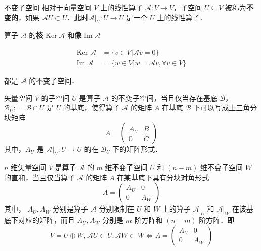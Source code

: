 

\begin{definition}{不变子空间}
相对于向量空间 $V$ 上的线性算子 $\mathcal{A}: V \rightarrow V$，子空间 $U \subseteq V$ 被称为\textbf{不变的}，如果 $\mathcal{A} U \subset U$．此时$\mathcal{A}|_U: U \to U$ 是一个 $U$ 上的线性算子．
\end{definition}

\begin{example}{}
算子 $\mathcal{A}$ 的\textbf{核} $\mathrm{Ker}\;\mathcal A$ 和\textbf{像} $\mathrm{Im}\;\mathcal{A}$

\begin{equation}\label{InvSP_eq3}
\begin{aligned}
\mathrm{Ker}\;\mathcal{A}&=\{ v\in V|\mathcal{A} v= 0\}\\
\mathrm{Im}\;\mathcal{A}&=\{ w\in V| w=\mathcal{A} v,\forall v\in V\}
\end{aligned}
\end{equation}

都是 $\mathcal A$ 的不变子空间．
\end{example}

\begin{theorem}{}
矢量空间 $V$ 的子空间 $U$ 是算子 $\mathcal{A}$ 的不变子空间，当且仅当存在基底 $\mathcal{B}$， $\mathcal{B}_U: = \mathcal{B} \cap U$ 是 $U$ 的基底，使得算子 $\mathcal{A}$ 的矩阵 $A$ 在基底 $\mathcal{B}$ 下可以写成上三角分块矩阵
\begin{equation}
A = \begin{pmatrix}
A_U & B\\
0 & C
\end{pmatrix}
\end{equation}
其中，$A_U$ 是 $\mathcal{A}|_{U}: U \to U$ 的在 $\mathcal{B}_U$ 下的矩阵形式．
\end{theorem}

\begin{theorem}{}\label{InvSP_the1}
$n$ 维矢量空间 $V$ 是算子 $\mathcal{A}$ 的 $m$ 维不变子空间 $U$ 和 $(n-m)$ 维不变子空间 $W$ 的直和，当且仅当算子 $\mathcal{A}$ 的矩阵 $A$ 在某基底下具有分块对角形式
\begin{equation}\label{InvSP_eq1}
A=\begin{pmatrix}
A_U&0\\
0&A_W
\end{pmatrix}
\end{equation}
其中， $A_U,A_W$ 分别是算子 $\mathcal{A}$ 分别限制在 $U$ 和 $W$ 上的算子 $\mathcal{A}|_U$ 和 $\mathcal{A}|_W$ 在该基底下对应的矩阵，而且 $A_U,A_W$ 分别是 $m$ 阶方阵和 $(n-m)$ 阶方阵．即
\begin{equation}
V=U\oplus W,\mathcal{A}U\subset U,\mathcal{A}W\subset W\Leftrightarrow A=\begin{pmatrix}
A_U&0\\
0&A_W
\end{pmatrix}
\end{equation}

\end{theorem}

